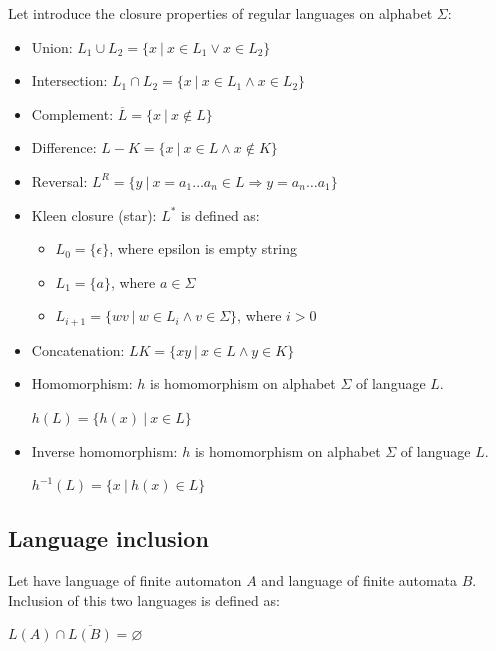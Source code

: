		Let introduce the closure properties of regular languages on alphabet $\Sigma$:
		\begin{itemize}
			\item Union:  $L_1 \cup L_2=\{x\ |\ x \in L_1 \vee x\in L_2\}$
			\item Intersection:  $L_1 \cap L_2=\{x\ |\ x \in L_1 \wedge x\in L_2\}$
			\item Complement: $\overline{L}=\{x\ |\ x\not\in L\}$
			\item Difference: $L-K=\{x\ |\ x\in L \wedge x\not\in K\}$
			\item Reversal: $L^R = \{y\ |\ x=a_1\dots a_n \in L \Rightarrow y=a_n\dots a_1\}$
			\item Kleen closure (star): $L^{*}$ is defined as:
			\begin{itemize}
				\item $L_0=\{\epsilon\}$, where epsilon is empty string
				\item $L_1=\{a\}$, where $a\in \Sigma$
				\item $L_{i+1}=\{wv\ |\ w\in L_i \wedge v \in \Sigma\}$, where $i>0$
			\end{itemize}
			\item Concatenation: $LK=\{xy\ |\ x\in L \wedge y\in K\}$
			\item Homomorphism: $h$ is homomorphism on alphabet $\Sigma$ of language $L$.

$h(L)=\{h(x)\ |\ x \in L\}$
			\item Inverse homomorphism: $h$ is homomorphism on alphabet $\Sigma$ of language $L$.

$h^{-1}(L)=\{x\ |\ h(x) \in L\}$
		\end{itemize}

		\subsection{Language inclusion}
		\label{defIncl}
		\begin{definition}
		Let have language of finite automaton $A$ and language of finite automata $B$. Inclusion of this two languages is defined as:
		\begin{description}
			$L(A)\cap \overline{L(B)} = \varnothing$
		\end{description}
		\end{definition}

